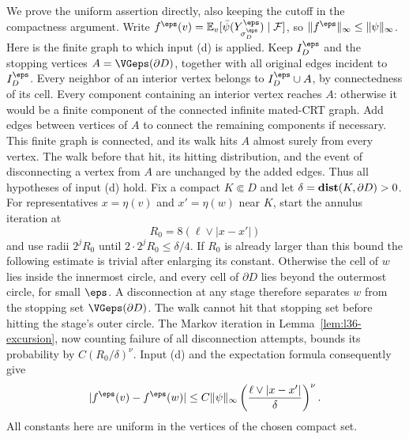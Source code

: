 We prove the uniform assertion directly, also keeping the
cutoff in the compactness argument.
Write $f^\eps(v)=\mathbb{E}_v[\bar\psi(Y^\eps_{\sigma_D^\eps})\mid\mathcal F]$,
so $\|f^\eps\|_\infty\le\|\psi\|_\infty$.
Here is the finite graph to which input (d) is applied.
Keep $I_D^\eps$ and the stopping vertices
$A=\VGeps(\partial D)$, together with all original edges incident
to $I_D^\eps$. Every neighbor of an interior vertex belongs
to $I_D^\eps\cup A$, by connectedness of its cell.
Every component containing an interior vertex reaches $A$:
otherwise it would be a finite component of the connected
infinite mated-CRT graph.
Add edges between vertices of $A$ to connect the remaining
components if necessary. This finite graph is connected,
and its walk hits $A$ almost surely from every vertex.
The walk before that hit, its hitting distribution, and
the event of disconnecting a vertex from $A$ are unchanged
by the added edges. Thus all hypotheses of input (d) hold.
Fix a compact $K\Subset D$ and let
$\delta=\mathop{\bf dist{}}(K,\partial D)>0$.
For representatives $x=\eta(v)$ and $x'=\eta(w)$ near $K$,
start the annulus iteration at
\[
 R_0=8(\ell\vee|x-x'|)
\]
and use radii $2^jR_0$ until $2\cdot2^jR_0\le\delta/4$.
If $R_0$ is already larger than this bound the following
estimate is trivial after enlarging its constant.
Otherwise the cell of $w$ lies inside the innermost circle,
and every cell of $\partial D$ lies beyond the outermost
circle, for small $\eps$. A disconnection at any stage
therefore separates $w$ from the stopping set
$\VGeps(\partial D)$. The walk cannot hit that stopping set
before hitting the stage's outer circle.
The Markov iteration in Lemma~\ref{lem:l36-excursion}, now counting
failure of all disconnection attempts, bounds its probability
by $C(R_0/\delta)^\nu$.
Input (d) and the expectation formula consequently give
\begin{equation}\label{eq:l36-interior-modulus}
 |f^\eps(v)-f^\eps(w)|
 \le C\|\psi\|_\infty
       \left(\frac{\ell\vee|x-x'|}{\delta}\right)^\nu.
\end{equation}
All constants here are uniform in the vertices of the
chosen compact set.


